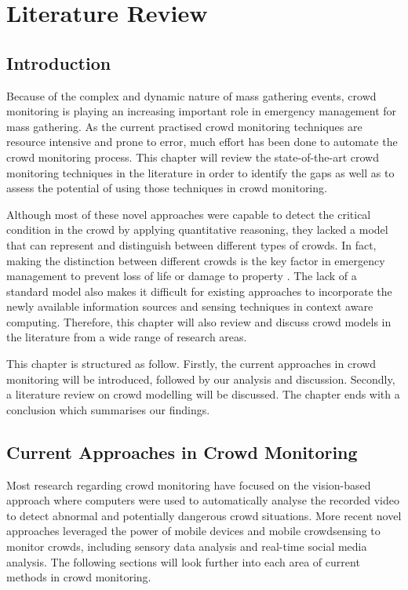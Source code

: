 \chapter{Literature Review}
\label{ch:litReview}
\ifpdf
    \graphicspath{{Chapter2/Figs/Raster/}{Chapter2/Figs/PDF/}{Chapter2/Figs/}}
\else
    \graphicspath{{Chapter2/Figs/Vector/}{Chapter2/Figs/}}
\fi

\section{Introduction}
Because of the complex and dynamic nature of mass gathering events, crowd monitoring is playing an increasing important role in emergency management for mass gathering. As the current practised crowd monitoring techniques are resource intensive and prone to error, much effort has been done to automate the crowd monitoring process. This chapter will review the state-of-the-art crowd monitoring techniques in the literature in order to identify the gaps as well as to assess the potential of using those techniques in crowd monitoring.

Although most of these novel approaches were capable to detect the critical condition in the crowd by applying quantitative reasoning, they lacked a model that can represent and distinguish between different types of crowds. In fact, making the distinction between different crowds is the key factor in emergency management to prevent loss of life or damage to property \citep{Berlonghi1995}. The lack of a standard model also makes it difficult for existing approaches to incorporate the newly available information sources and sensing techniques in context aware computing. Therefore, this chapter will also review and discuss crowd models in the literature from a wide range of research areas.

This chapter is structured as follow. Firstly, the current approaches in crowd monitoring will be introduced, followed by our analysis and discussion. Secondly, a literature review on crowd modelling will be discussed. The chapter ends with a conclusion which summarises our findings.

\section{Current Approaches in Crowd Monitoring}
Most research regarding crowd monitoring have focused on the vision-based approach where computers were used to automatically analyse the recorded video to detect abnormal and potentially dangerous crowd situations. More recent novel approaches leveraged the power of mobile devices and mobile crowdsensing to monitor crowds, including sensory data analysis and real-time social media analysis. The following sections will look further into each area of current methods in crowd monitoring. 

